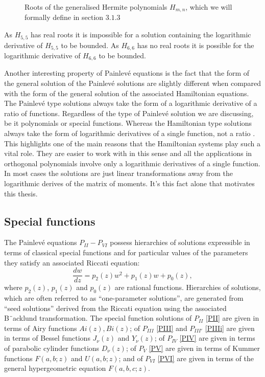 \documentclass[12pt]{article}
\def\P{Painlev\'e }
\numberwithin{figure}{section}
\numberwithin{equation}{section}
\numberwithin{table}{section}
\begin{document}
\begin{figure}[H]
\centering
{}
\caption{Roots of the generalised Hermite polynomials $H_{m,n}$, which we will formally define in section $3.1.3$}
\end{figure}
As $H_{5,5}$ has real roots it is impossible for a solution containing the logarithmic derivative of $H_{5,5}$ to be bounded. As $H_{6,6}$ has no real roots it is possible for the logarithmic derivative of $H_{6,6}$ to be bounded.

Another interesting property of \P equations is the fact that the form of the general solution of the \P solutions are slightly different when compared with the form of the general solution of the associated Hamiltonian equations. The \P type solutions always take the form of a logarithmic derivative of a ratio of functions. Regardless of the type of \P solution we are discussing, be it polynomials or special functions. Whereas the Hamiltonian type solutions always take the form of logarithmic derivatives of a single function, not a ratio \cite{P:146:337,P:13:47,P:275:221}. This highlights one of the main reasons that the Hamiltonian systems play such a vital role. They are easier to work with in this sense and all the applications in orthogonal polynomials involve only a logarithmic derivatives of a single function. In most cases the solutions are just linear transformations away from the logarithmic derives of the matrix of moments. It's this fact alone that motivates this thesis.

\subsection{Special functions}
The \P equations $P_{II} - P_{VI}$ possess hierarchies of solutions expressible in terms of classical special functions and for particular values of the parameters they satisfy an associated Riccati equation:
\begin{equation}
\frac{dw}{dz}=p_2(z)w^2+p_1(z)w+p_0(z),\label{RicG}
\end{equation}
where $p_2(z)$, $p_1(z)$ and $p_0(z)$ are rational functions. Hierarchies of solutions, which are often referred to as “one-parameter solutions”, are generated from “seed solutions” derived from the Riccati
equation using the associated B¨acklund transformation. The special function solutions of $P_{II}$ \eqref{PII} are given in terms of Airy functions $Ai(z),Bi(z)$; of $P_{III}$ \eqref{PIII} and $P_{III'}$ \eqref{PIIIi} are given in terms of Bessel functions $J_\nu(z)$ and $Y_\nu(z)$; of $P_{IV}$ \eqref{PIV} are given in terms of parabolic cylinder functions $D_\nu(z)$; of $P_{V}$ \eqref{PV} are given in terms of Kummer functions $F(a,b;z)$ and $U(a,b;z)$; and of $P_{VI}$ \eqref{PVI} are given in terms of the general hypergeometric equation $F(a,b,c;z)$.
\end{document}
